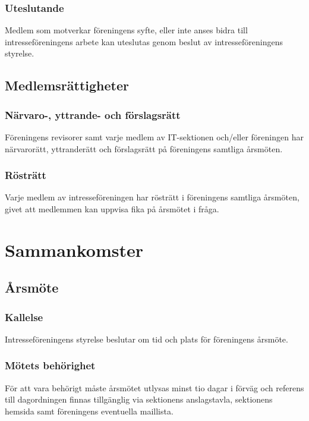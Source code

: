 \documentclass[11pt, noincludeaddress]{classes/cthit}
\begin{document}
\subsubsection{Uteslutande}
Medlem som motverkar föreningens syfte, eller inte anses bidra till intresseföreningens arbete kan uteslutas genom beslut av intresseföreningens styrelse. 

\subsection{Medlemsrättigheter}

\subsubsection{Närvaro-, yttrande- och förslagsrätt}
Föreningens revisorer samt varje medlem av IT-sektionen och/eller föreningen har närvarorätt, yttranderätt och förslagsrätt på föreningens samtliga årsmöten. 

\subsubsection{Rösträtt}
Varje medlem av intresseföreningen har rösträtt i föreningens samtliga årsmöten, givet att medlemmen kan uppvisa fika på årsmötet i fråga.





\section{Sammankomster}

\subsection{Årsmöte}

\subsubsection{Kallelse}
Intresseföreningens styrelse beslutar om tid och plats för föreningens årsmöte. 

\subsubsection{Mötets behörighet}
För att vara behörigt måste årsmötet utlysas minst tio dagar i förväg och referens till dagordningen finnas tillgänglig via sektionens anslagstavla, sektionens hemsida samt föreningens eventuella maillista. 
\end{document}

